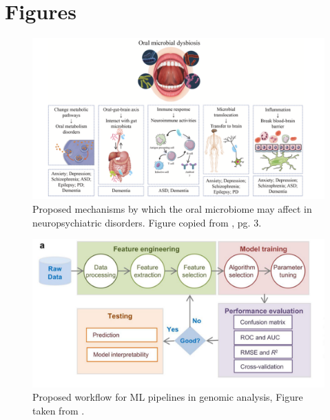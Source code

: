 \documentclass{article}
\begin{document}
\section{Figures}
\begin{figure}[h]
\includegraphics[width = \textwidth]{../figures/dysbiosis-oral-diagram.png}
\caption{Proposed mechanisms by which the oral microbiome may affect in neuropsychiatric disorders. Figure copied from \cite{tao_relationship_2024}, pg. 3.}
\end{figure}\label{mouth}
\begin{figure}[h]
\begin{center}
\includegraphics[width = \textwidth]{../figures/ml-workflow}
\caption{Proposed workflow for ML pipelines in genomic analysis, Figure taken from \cite{li_machine_2022}.}
\end{center}
\end{figure}\label{mouth}
\end{document}
